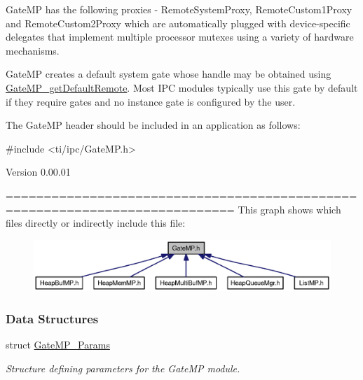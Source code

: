 GateMP has the following proxies -\/ RemoteSystemProxy, RemoteCustom1Proxy and RemoteCustom2Proxy which are automatically plugged with device-\/specific delegates that implement multiple processor mutexes using a variety of hardware mechanisms.

GateMP creates a default system gate whose handle may be obtained using \hyperlink{_gate_m_p_8h_a6c09c820ed3852840f0ce3036a276687}{GateMP\_\-getDefaultRemote}. Most IPC modules typically use this gate by default if they require gates and no instance gate is configured by the user.

The GateMP header should be included in an application as follows: 
\begin{DoxyCode}
  #include <ti/ipc/GateMP.h>
\end{DoxyCode}


\begin{DoxyVersion}{Version}
0.00.01
\end{DoxyVersion}
============================================================================ This graph shows which files directly or indirectly include this file:
\nopagebreak
\begin{figure}[H]
\begin{center}
\leavevmode
\includegraphics[width=400pt]{_gate_m_p_8h__dep__incl}
\end{center}
\end{figure}
\subsubsection*{Data Structures}
\begin{DoxyCompactItemize}
\item 
struct \hyperlink{struct_gate_m_p___params}{GateMP\_\-Params}
\begin{DoxyCompactList}\small\item\em Structure defining parameters for the GateMP module. \item\end{DoxyCompactList}\end{DoxyCompactItemize}
